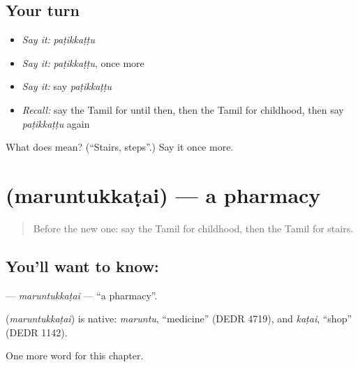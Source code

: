 \subsection*{Your turn}
\begin{itemize}
\raggedright
  \item \emph{Say it:} \emph{paṭikkaṭṭu}
  \item \emph{Say it:} \emph{paṭikkaṭṭu}, once more
  \item \emph{Say it:} say \emph{paṭikkaṭṭu}
  \item \emph{Recall:} say the Tamil for until then, then the Tamil for childhood, then say \emph{paṭikkaṭṭu} again
\end{itemize}

\begin{tcolorbox}[breakable,colback=teal!4,colframe=teal!35!black,title={Before you move on}]
What does  mean? (\textquotedblleft{}Stairs, steps\textquotedblright{}.) Say it once more.
\end{tcolorbox}
\section[\texorpdfstring{\ta{மருந்துக்கடை} (maruntukkaṭai)}{மருந்துக்கடை (maruntukkaṭai)}]{ (maruntukkaṭai) — a pharmacy}

\label{lesson:TA-C204-maruntukkatai}



\begin{quote}
Before the new one: say the Tamil for childhood, then the Tamil for stairs.
\end{quote}

\subsection*{You'll want to know: }
\textbf{} — \emph{maruntukkaṭai} — \textquotedblleft{}a pharmacy\textquotedblright{}.

\begin{cousinweb}
\textbf{} (\emph{maruntukkaṭai}) is native: \emph{maruntu}, \textquotedblleft{}medicine\textquotedblright{} (DEDR 4719), and \emph{kaṭai}, \textquotedblleft{}shop\textquotedblright{} (DEDR 1142).
\end{cousinweb}

\begin{grammarlens}[title={What you've built}]
One more word for this chapter.
\end{grammarlens}

